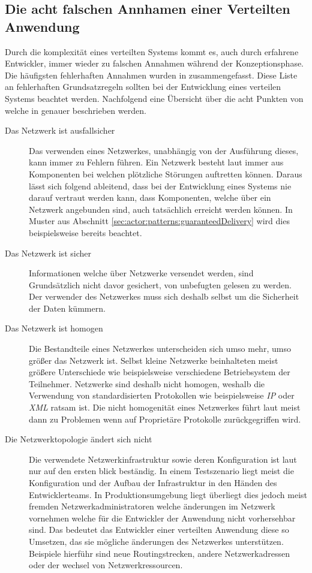 \subsection{Die acht falschen Annhamen einer Verteilten Anwendung}\label{sec:distributedSystems:wrongAssumptions} 
Durch die komplexität eines verteilten Systems kommt es, auch durch erfahrene Entwickler, immer wieder zu falschen Annahmen während der Konzeptionsphase. Die häufigsten fehlerhaften Annahmen wurden in \cite{deutsch1994eight} zusammengefasst. Diese Liste an fehlerhaften Grundsatzregeln sollten bei der Entwicklung eines verteilen Systems beachtet werden. Nachfolgend eine Übersicht über die acht Punkten von \cite{deutsch1994eight} welche in \cite{rotem2006fallacies} genauer beschrieben werden.
\begin{description}
    \item[Das Netzwerk ist ausfallsicher]
    Das verwenden eines Netzwerkes, unabhängig von der Ausführung dieses, kann immer zu Fehlern führen. Ein Netzwerk besteht laut \cite{rotem2006fallacies} immer aus Komponenten bei welchen plötzliche Störungen auftretten können. Daraus lässt sich folgend ableitend, dass bei der Entwicklung eines Systems nie darauf vertraut werden kann, dass Komponenten, welche über ein Netzwerk angebunden sind, auch tatsächlich erreicht werden können. In Muster aus Abschnitt \ref{sec:actor:patterns:guaranteedDelivery} wird dies beispielsweise bereits beachtet.
    \item[Das Netzwerk ist sicher]
    Informationen welche über Netzwerke versendet werden, sind Grundsätzlich nicht davor gesichert, von unbefugten gelesen zu werden. Der verwender des Netzwerkes muss sich deshalb selbst um die Sicherheit der Daten kümmern.
    \item[Das Netzwerk ist homogen]
    Die Bestandteile eines Netzwerkes unterscheiden sich umso mehr, umso größer das Netzwerk ist. Selbst kleine Netzwerke beinhalteten meist größere Unterschiede wie beispielsweise verschiedene Betriebsystem der Teilnehmer. Netzwerke sind deshalb nicht homogen, weshalb die Verwendung von standardisierten Protokollen wie beispielsweise \textit{IP} oder \textit{XML} ratsam ist. Die nicht homogenität eines Netzwerkes führt laut \cite{rotem2006fallacies} meist dann zu Problemen wenn auf Proprietäre Protokolle zurückgegriffen wird.
    \item[Die Netzwerktopologie ändert sich nicht]
    Die verwendete Netzwerkinfrastruktur sowie deren Konfiguration ist laut \cite{rotem2006fallacies} nur auf den ersten blick beständig. In einem Testszenario liegt meist die Konfiguration und der Aufbau der Infrastruktur in den Händen des Entwicklerteams. In Produktionsumgebung liegt überliegt dies jedoch meist fremden Netzwerkadministratoren welche änderungen im Netzwerk vornehmen welche für die Entwickler der Anwendung nicht vorhersehbar sind. Das bedeutet das Entwickler einer verteilten Anwendung diese so Umsetzen, das sie mögliche änderungen des Netzwerkes unterstützen.  Beispiele hierführ sind neue Routingstrecken, andere Netzwerkadressen oder der wechsel von Netzwerkressourcen. 

\end{description}

